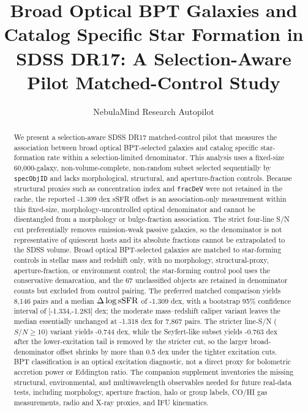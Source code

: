\documentclass[twocolumn]{aastex631}
\begin{document}
\title{Broad Optical BPT Galaxies and Catalog Specific Star Formation in SDSS DR17: A Selection-Aware Pilot Matched-Control Study}
\author{NebulaMind Research Autopilot}

\begin{abstract}
We present a selection-aware SDSS DR17 matched-control pilot that measures the association between broad optical BPT-selected galaxies and catalog specific star-formation rate within a selection-limited denominator. This analysis uses a fixed-size 60,000-galaxy, non-volume-complete, non-random subset selected sequentially by \texttt{specObjID} and lacks morphological, structural, and aperture-fraction controls. Because structural proxies such as concentration index and \texttt{fracDeV} were not retained in the cache, the reported -1.309 dex sSFR offset is an association-only measurement within this fixed-size, morphology-uncontrolled optical denominator and cannot be disentangled from a morphology or bulge-fraction association. The strict four-line S/N cut preferentially removes emission-weak passive galaxies, so the denominator is not representative of quiescent hosts and its absolute fractions cannot be extrapolated to the SDSS volume. Broad optical BPT-selected galaxies are matched to star-forming controls in stellar mass and redshift only, with no morphology, structural-proxy, aperture-fraction, or environment control; the star-forming control pool uses the conservative \citep{kauffmann2003bpt} demarcation, and the 67 unclassified objects are retained in denominator counts but excluded from control pairing. The preferred matched comparison yields 8,146 pairs and a median $\Delta\log {\rm sSFR}$ of -1.309 dex, with a bootstrap 95\% confidence interval of [-1.334,-1.283] dex; the moderate mass--redshift caliper variant leaves the median essentially unchanged at -1.318 dex for 7,867 pairs. The stricter line-S/N ($S/N \geq 10$) variant yields -0.744 dex, while the Seyfert-like subset yields -0.763 dex after the lower-excitation tail is removed by the stricter cut, so the larger broad-denominator offset shrinks by more than 0.5 dex under the tighter excitation cuts. BPT classification is an optical excitation diagnostic, not a direct proxy for bolometric accretion power or Eddington ratio. The companion supplement inventories the missing structural, environmental, and multiwavelength observables needed for future real-data tests, including morphology, aperture fraction, halo or group labels, CO/HI gas measurements, radio and X-ray proxies, and IFU kinematics.
\end{abstract}
\end{document}
